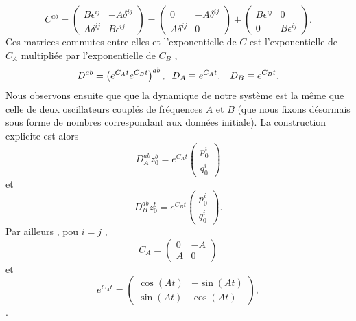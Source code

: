 \documentclass[12pt,a4paper, openany]{report}
\begin{document}
	\begin{equation}
		C^{ab}=
		\begin{pmatrix}
			B\epsilon^{ij} & -A\delta^{ij}\\
			A\delta^{ij} & B\epsilon^{ij}
		\end{pmatrix} 
		=
		\begin{pmatrix}
			0 & -A\delta^{ij}\\
			A\delta^{ij} & 0
		\end{pmatrix}
		+
		\begin{pmatrix}
			B\epsilon^{ij}& 0 \\
			0 & B\epsilon^{ij}	
		\end{pmatrix} .
	\end{equation} Ces matrices commutes entre elles et l'exponentielle de $C$ est l'exponentielle de $C_A$ multipliée par l'exponentielle de $C_B$ ,
	\begin{equation}
		D^{ab}=\left(e^{C_{A}t}e^{C_{B}t}\right)^{ab},\hspace{0.2cm}D_A\equiv e^{C_{A}t},\hspace{0.3cm} D_B\equiv e^{C_{B}t} .
	\end{equation} Nous observons ensuite que que la dynamique de notre système est la m\^{e}me que celle de deux oscillateurs couplés  de fréquences $A$ et $B$ (que nous fixons désormais sous forme de nombres correspondant aux données initiale). La construction explicite est alors 
	\begin{equation}
		D^{ab}_A z_0^b=e^{C_{A}t}
		\begin{pmatrix}
			p^i_0 \\
			q^i_0
		\end{pmatrix}	
	\end{equation}
	et 
	\begin{equation}
		D^{ab}_B z_0^b=e^{C_{B}t}
		\begin{pmatrix}
			p^i_0 \\
			q^i_0
		\end{pmatrix} .
	\end{equation}
	Par ailleurs , pou $i=j$ , 
	\begin{equation}
		C_{A}=
		\begin{pmatrix}
			0 & -A\\
			A & 0
		\end{pmatrix}	
	\end{equation}
	et 
	\begin{equation}
		e^{C_{A}t}=
		\begin{pmatrix}
			\cos(At) & -\sin(At) \\
			\sin(At) & \cos(At)
		\end{pmatrix}  ,	
	\end{equation} .
\end{document}
